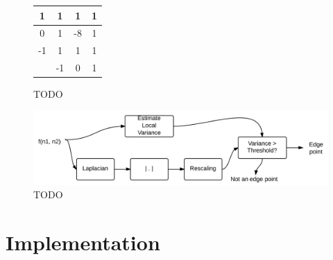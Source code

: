 \documentclass[12pt]{amsart}
\begin{document}
\begin{figure}
\centering
\begin{tabular}{c || c | c | c }
1 & 1 & 1 & 1 \\
\hline
0 & 1 & -8 & 1 \\
\hline
-1 & 1 & 1 & 1 \\
\hline\hline
& -1 & 0 & 1 \\
\end{tabular}
\caption{TODO}
\label{fig:TODO}
\end{figure}

\begin{figure}
\centering
\includegraphics[width=\linewidth]{LaplacianMethod.png}
\caption{TODO}
\label{fig:TODO}
\end{figure}

\section{Implementation}
\end{document}
